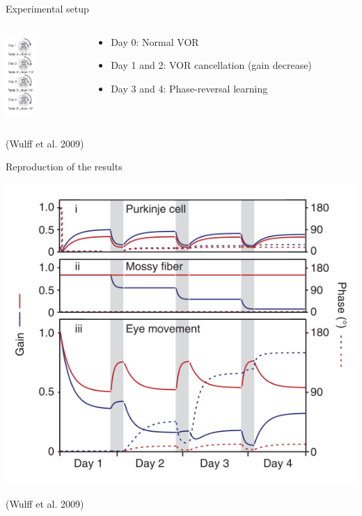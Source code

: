\documentclass[ignorenonframetext,]{beamer}
\begin{document}
\begin{frame}{Experimental setup}

\begin{columns}[T] %
\begin{column}[T]{5cm} %
\includegraphics[height=3cm]{images/vvor.png}
\end{column}
\begin{column}[T]{5cm} %
\begin{itemize}
\item Day 0: Normal VOR
\item Day 1 and 2: VOR cancellation (gain decrease)
\item Day 3 and 4: Phase-reversal learning
\end{itemize}
\end{column}
\end{columns}

(Wulff et al. 2009)

\end{frame}

\begin{frame}{Reproduction of the results}

\includegraphics{images/gain.png}

(Wulff et al. 2009)

\end{frame}
\end{document}
